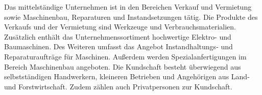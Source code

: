 Das mittelständige Unternehmen ist in den Bereichen Verkauf und Vermietung sowie Maschinenbau, Reparaturen und Instandsetzungen tätig. Die Produkte des Verkaufs und der Vermietung sind Werkzeuge und Verbrauchsmaterialien. Zusätzlich enthält das Unternehmenssortiment hochwertige Elektro- und Baumaschinen. Des Weiteren umfasst das Angebot Instandhaltungs- und Reparaturaufträge für Maschinen. Außerdem werden Spezialanfertigungen im Bereich Maschinenbau angeboten. Die Kundschaft besteht überwiegend aus selbstständigen Handwerkern, kleineren Betrieben und Angehörigen aus Land- und Forstwirtschaft. Zudem zählen auch Privatpersonen zur Kundschaft. \cite{einleitung1}